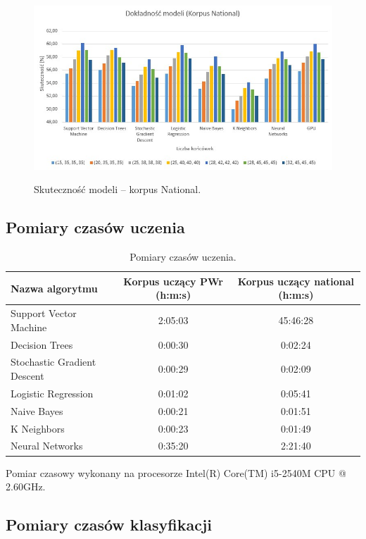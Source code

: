 \begin{figure}[!htbp]
	\centering
	\includegraphics[width=\linewidth]{charts/korpusnationalwykres}
	\label{Rysunek}
	\caption{Skuteczność modeli -- korpus National.}
\end{figure}

\newpage
\subsection{Pomiary czasów uczenia}

\begin{table}[H]
	\centering
	\caption{Pomiary czasów uczenia.}
	\smallskip
	\begin{tabular}{lcc}
		\toprule
		\textbf{Nazwa algorytmu} & \textbf{Korpus uczący PWr (h:m:s)} &  \textbf{Korpus uczący national (h:m:s)} \\
		\midrule
		Support Vector Machine & 2:05:03 & 45:46:28 \\
		Decision Trees & 0:00:30 & 0:02:24 \\
		Stochastic Gradient Descent & 0:00:29 & 0:02:09 \\
		Logistic Regression & 0:01:02 & 0:05:41 \\
		Naive Bayes & 0:00:21 & 0:01:51 \\
		K Neighbors & 0:00:23 & 0:01:49 \\
		Neural Networks & 0:35:20 & 2:21:40 \\
		\bottomrule
	\end{tabular}
\end{table}


Pomiar czasowy wykonany na procesorze Intel(R) Core(TM) i5-2540M CPU @ 2.60GHz.


\newpage
\subsection{Pomiary czasów klasyfikacji}

